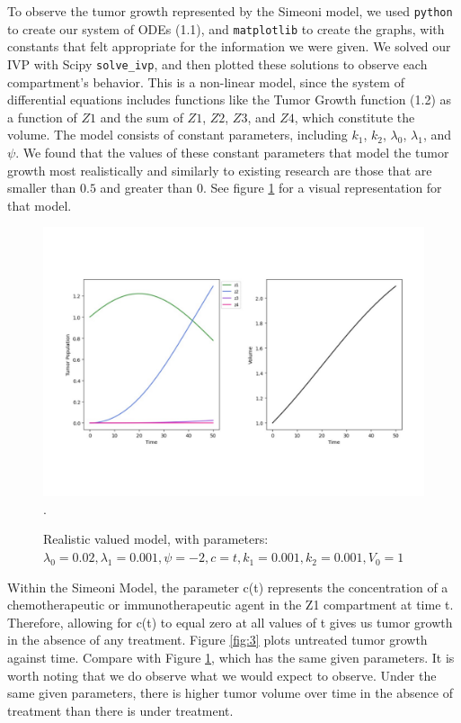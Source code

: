 \documentclass[11pt,reqno]{amsart}
\begin{document}
To observe the tumor growth represented by the Simeoni model, we used \verb!python! to create our system of ODEs (1.1), and  \verb!matplotlib! to create the graphs, with constants that felt appropriate for the information we were given. We solved our IVP with Scipy \verb!solve_ivp!, and then plotted these solutions to observe each compartment's behavior. This is a non-linear model, since the system of differential equations includes functions like the Tumor Growth function (1.2) as a function of $Z1$ and the sum of $Z1$, $Z2$, $Z3$, and $Z4$, which constitute the volume. The model consists of constant parameters, including $k_1$, $k_2$, $\lambda_0$, $\lambda_1$, and $\psi$. We found that the values of these constant parameters that model the tumor growth most realistically and similarly to existing research \cite{Koziol_Falls_Schnitzer_2020} are those that are smaller than $0.5$ and greater than $0$. See figure \ref{fig:2} for a visual representation for that model. 
\begin{figure}[h]
\begin{center} %
\includegraphics[width=\textwidth]{parameters_like_paper.pdf}. %
\end{center}
\caption{Realistic valued model, with parameters: $\lambda_0=0.02, \lambda_1=0.001, \psi=-2, c=t, k_1=0.001, k_2=0.001, V_0=1$}
\label{fig:2}
\end{figure}

Within the Simeoni Model, the parameter c(t) represents the concentration of a chemotherapeutic or immunotherapeutic agent in the Z1 compartment at time t. Therefore, allowing for c(t) to equal zero at all values of t gives us tumor growth in the absence of any treatment. Figure \ref{fig:3} plots untreated tumor growth against time. Compare with Figure \ref{fig:2}, which has the same given parameters. It is worth noting that we do observe what we would expect to observe. Under the same given parameters, there is higher tumor volume over time in the absence of treatment than there is under treatment.
\end{document}
